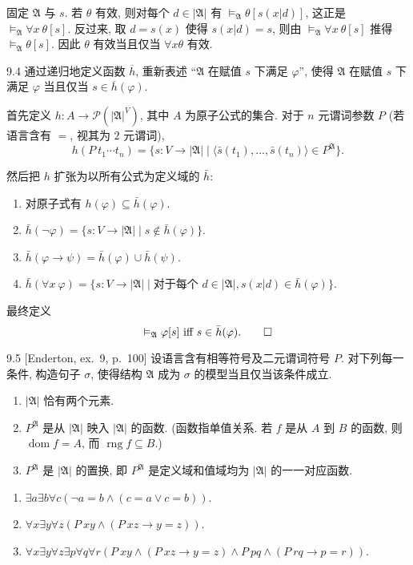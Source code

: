 固定 $\mathfrak{A}$ 与 $s$. 若 $\theta$ 有效, 则对每个 $d\in|\mathfrak{A}|$ 有 $\vDash_{\mathfrak{A}}\theta[s(x|d)]$, 这正是 $\vDash_{\mathfrak{A}}\forall x\ \theta[s]$. 反过来, 取 $d=s(x)$ 使得 $s(x|d)=s$, 则由 $\vDash_{\mathfrak{A}}\forall x\ \theta[s]$ 推得 $\vDash_{\mathfrak{A}}\theta[s]$. 因此 $\theta$ 有效当且仅当 $\forall x\theta$ 有效.

\begin{exercise}{9.4}
  通过递归地定义函数 $\overline{h}$, 重新表述 “$\mathfrak{A}$ 在赋值 $s$ 下满足 $\varphi$”, 使得 $\mathfrak{A}$ 在赋值 $s$ 下满足 $\varphi$ 当且仅当 $s\in\overline{h}(\varphi)$.
\end{exercise}

首先定义 $h:A\rightarrow \mathcal{P}(|\mathfrak{A}|^V)$, 其中 $A$ 为原子公式的集合. 对于 $n$ 元谓词参数 $P$ (若语言含有 $=$, 视其为 $2$ 元谓词),
\[
  h(P\ t_1\cdots t_n)=\{s:V\rightarrow|\mathfrak{A}|\mid\langle\bar{s}(t_1),\dots,\bar{s}(t_n)\rangle\in P^{\mathfrak{A}}\}.
\]

然后把 $h$ 扩张为以所有公式为定义域的 $\bar{h}$:
\begin{enumerate}
  \item 对原子式有 $h(\varphi)\subseteq\bar{h}(\varphi)$.
  \item $\bar{h}(\neg \varphi)=\{s:V\rightarrow|\mathfrak{A}|\mid s\notin\bar{h}(\varphi)\}$.
  \item $\bar{h}(\varphi\rightarrow \psi)=\bar{h}(\varphi)\cup\bar{h}(\psi)$.
  \item $\bar{h}(\forall x\ \varphi)=\{s:V\rightarrow|\mathfrak{A}|\mid\text{对于每个 }d\in|\mathfrak{A}|, s(x|d)\in\bar{h}(\varphi)\}$.
\end{enumerate}
最终定义
\[
  \vDash_{\mathfrak{A}}\varphi[s]\text{ iff }s\in\bar{h}(\varphi).\qedhere
\]

\begin{exercise}{9.5}
  [Enderton, ex.~9, p.~100]
  设语言含有相等符号及二元谓词符号 $P$. 对下列每一条件, 构造句子 $\sigma$, 使得结构 $\mathfrak{A}$ 成为 $\sigma$ 的模型当且仅当该条件成立.
  \begin{enumerate}[label=(\alph*)]
    \item $|\mathfrak{A}|$ 恰有两个元素.
    \item $P^{\mathfrak{A}}$ 是从 $|\mathfrak{A}|$ 映入 $|\mathfrak{A}|$ 的函数. (函数指单值关系. 若 $f$ 是从 $A$ 到 $B$ 的函数, 则 $\operatorname{dom}f=A$, 而 $\operatorname{rng}f\subseteq B$.)
    \item $P^{\mathfrak{A}}$ 是 $|\mathfrak{A}|$ 的置换, 即 $P^{\mathfrak{A}}$ 是定义域和值域均为 $|\mathfrak{A}|$ 的一一对应函数.\qedhere
  \end{enumerate}
\end{exercise}

\begin{enumerate}
  \item $\exists a\exists b\forall c(\neg a=b\wedge(c=a\vee c=b))$.
  \item $\forall x\exists y\forall z(P\ xy\wedge(P\ xz\to y=z))$.
  \item $\forall x\exists y\forall z\exists p\forall q\forall r(P\ xy\wedge(P\ xz\to y=z)\wedge P\ pq\wedge(P\ rq\to p=r))$.
\end{enumerate}
